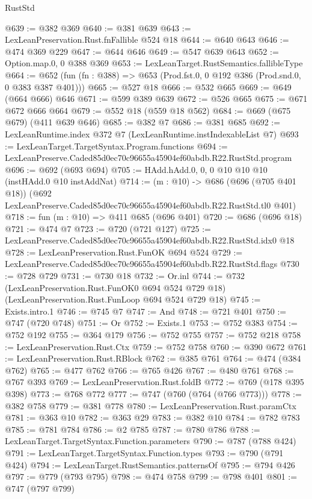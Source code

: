\begin{lexlean}{RustStd}
\begin{coremodule}
@639 := @382 @369
@640 := @381 @639
@643 := LexLeanPreservation.Rust.fnFallible @524 @18
@644 := @640 @643
@646 := @474 @369 @229
@647 := @644 @646
@649 := @547 @639 @643
@652 := Option.map.{0, 0} @388 @369
@653 := LexLeanTarget.RustSemantics.fallibleType
@664 := @652 (fun (fn : @388) => @653 (Prod.fst.{0, 0} @192 @386 (Prod.snd.{0, 0} @383 @387 @401)))
@665 := @527 @18
@666 := @532 @665
@669 := @649 (@664 @666) @646
@671 := @599 @389 @639
@672 := @526 @665
@675 := @671 @672 @666 @664
@679 := @552 @18 (@559 @18 @562)
@684 := @669 (@675 @679) (@411 @639 @646)
@685 := @382 @7
@686 := @381 @685
@692 := LexLeanRuntime.index @372 @7 (LexLeanRuntime.instIndexableList @7)
@693 := LexLeanTarget.TargetSyntax.Program.functions
@694 := LexLeanPreserve.Caded85d0ec70c96655a45904ef60abdb.R22.RustStd.program
@696 := @692 (@693 @694)
@705 := HAdd.hAdd.{0, 0, 0} @10 @10 @10 (instHAdd.{0} @10 instAddNat)
@714 := (m : @10) ->
  @686
    (@696 (@705 @401 @18))
    (@692 LexLeanPreserve.Caded85d0ec70c96655a45904ef60abdb.R22.RustStd.tl0 @401)
@718 := fun (m : @10) => @411 @685 (@696 @401)
@720 := @686 (@696 @18)
@721 := @474 @7
@723 := @720 (@721 @127)
@725 := LexLeanPreserve.Caded85d0ec70c96655a45904ef60abdb.R22.RustStd.idx0 @18
@728 := LexLeanPreservation.Rust.FunOK @694 @524
@729 := LexLeanPreserve.Caded85d0ec70c96655a45904ef60abdb.R22.RustStd.flags
@730 := @728 @729
@731 := @730 @18
@732 := Or.inl
@744 := @732
    (LexLeanPreservation.Rust.FunOK0 @694 @524 @729 @18)
    (LexLeanPreservation.Rust.FunLoop @694 @524 @729 @18)
@745 := Exists.intro.{1}
@746 := @745 @7
@747 := And
@748 := @721 @401
@750 := @747 (@720 @748)
@751 := Or
@752 := Exists.{1}
@753 := @752 @383
@754 := @752 @192
@755 := @364 @179
@756 := @752 @755
@757 := @752 @218
@758 := LexLeanPreservation.Rust.Ctx
@759 := @752 @758
@760 := @390 @672
@761 := LexLeanPreservation.Rust.RBlock
@762 := @385 @761
@764 := @474 (@384 @762)
@765 := @477 @762
@766 := @765 @426
@767 := @480 @761
@768 := @767 @393
@769 := LexLeanPreservation.Rust.foldB
@772 := @769 (@178 @395 @398)
@773 := @768 @772
@777 := @747 (@760 (@764 (@766 @773)))
@778 := @382 @758
@779 := @381 @778
@780 := LexLeanPreservation.Rust.paramCtx
@781 := @363 @10
@782 := @363 @29
@783 := @382 @10
@784 := @782 @783
@785 := @781 @784
@786 := @2 @785
@787 := @780 @786
@788 := LexLeanTarget.TargetSyntax.Function.parameters
@790 := @787 (@788 @424)
@791 := LexLeanTarget.TargetSyntax.Function.types
@793 := @790 (@791 @424)
@794 := LexLeanTarget.RustSemantics.patternsOf
@795 := @794 @426
@797 := @779 (@793 @795)
@798 := @474 @758
@799 := @798 @401
@801 := @747 (@797 @799)

\end{coremodule}
\end{lexlean}

